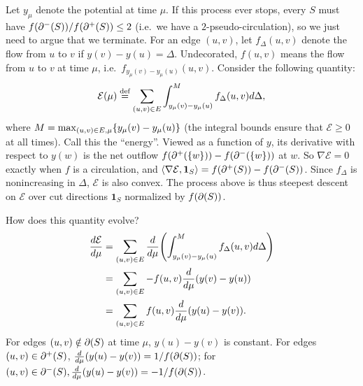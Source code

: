 \documentclass[12pt]{article}
\begin{document}
Let $y_\mu$ denote the potential at time $\mu$. If this process ever stops,
every $S$ must have $f(\incut{S})/f(\outcut{S}) \leq 2$ (i.e.\ we have a
$2$-pseudo-circulation), so we just need to argue that we terminate. For an edge
$(u, v)$, let $f_\Delta(u, v)$ denote the flow from $u$ to $v$ if
$y(v) - y(u) = \Delta$. Undecorated, $f(u, v)$ means the flow from $u$ to $v$ at
time $\mu$, i.e.\ $f_{y_\mu(v)-y_\mu(u)}(u, v)$. Consider the following
quantity:
\begin{align*}
  \mathcal{E}(\mu) \overset{\text{def}}{=} \sum_{(u, v) \in E} \int_{y_\mu(v)-y_\mu(u)}^M f_\Delta(u, v) d\Delta,
\end{align*}
where $M = \max_{(u, v) \in E, \mu}\Set{y_\mu(v) - y_\mu(u)}$ (the integral
bounds ensure that $\mathcal{E} \geq 0$ at all times). Call this the ``energy''.
Viewed as a function of $y$, its derivative with respect to $y(w)$ is the net
outflow $f(\outcut{\Set{w}}) - f(\incut{\Set{w}})$ at $w$. So
$\nabla \mathcal{E} = 0$ exactly when $f$ is a circulation, and
$\langle \nabla \mathcal{E}, \mathbf{1}_S \rangle = f(\outcut{S}) - f(\incut{S})$.
Since $f_\Delta$ is nonincreasing in $\Delta$, $\mathcal{E}$ is also convex. The
process above is thus steepest descent on $\mathcal{E}$ over cut directions
$\mathbf{1}_S$ normalized by $f(\cut{S})$.

How does this quantity evolve?
\begin{align*}
  \frac{d\mathcal{E}}{d\mu} & = \sum_{(u, v) \in E} \frac{d}{d\mu}\paren{\int_{y_\mu(v)-y_\mu(u)}^{M} f_\Delta(u, v) d\Delta} \\
                            & = \sum_{(u, v) \in E} -f(u, v)\frac{d}{d\mu}\paren{y(v) - y(u)}                                 \\
                            & = \sum_{(u, v) \in E} f(u, v)\frac{d}{d\mu}\paren{y(u) - y(v)}.
\end{align*}
For edges $(u, v) \notin \cut{S}$ at time $\mu$, $y(u) - y(v)$ is constant. For
edges $(u, v) \in \outcut{S}$, $\frac{d}{d\mu}(y(u) - y(v)) = 1/f(\cut{S})$; for
$(u, v) \in \incut{S}, \frac{d}{d\mu}(y(u) - y(v)) = -1/f(\cut{S})$.
\end{document}
